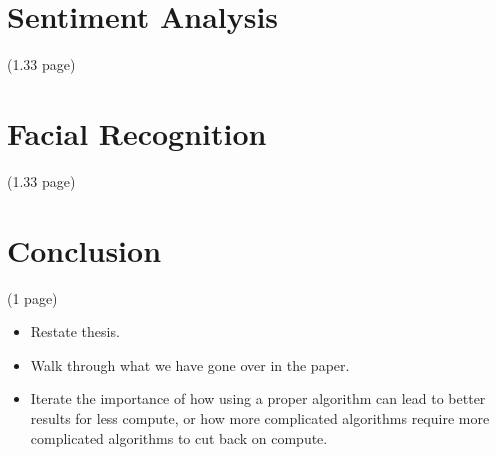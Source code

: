 \documentclass[stu,12pt,floatsintext]{apa7}
\begin{document}
\section{Sentiment Analysis}
(1.33 page)



\section{Facial Recognition}
(1.33 page)

\section{Conclusion}
(1 page)

\begin{itemize}
    \item Restate thesis.
    \item Walk through what we have gone over in the paper.
    \item Iterate the importance of how using a proper algorithm can lead to better results for less compute, or how more complicated algorithms require more complicated algorithms to cut back on compute. 
\end{itemize}

\printbibliography
\end{document}
